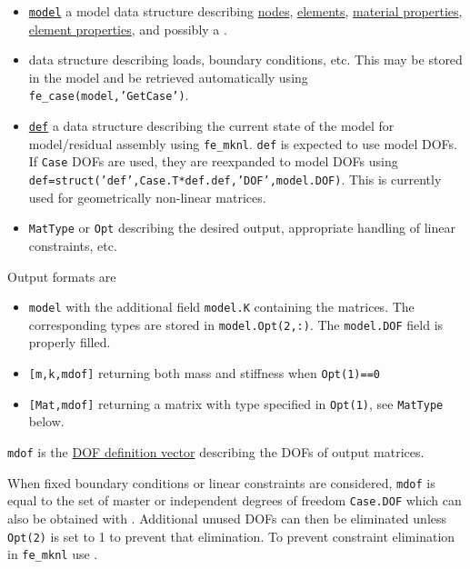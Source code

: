 \begin{itemize}

\item \hyperlink{model}{{\tt model}} a model data structure describing \hyperlink{node}{nodes}, \hyperlink{elt}{elements}, \hyperlink{pl}{material properties}, \hyperlink{il}{element properties}, and possibly a .

\item {} data structure describing loads, boundary conditions, etc. This may be stored in the model and be retrieved automatically using {\tt fe\_case(model,'GetCase')}. 

\item \hyperlink{def}{{\tt def}} a data structure describing the current state of the model for model/residual assembly using {\tt fe\_mknl}. {\tt def} is expected to use model DOFs. If {\tt Case} DOFs are used, they are reexpanded to model DOFs using {\tt def=struct('def',Case.T*def.def,'DOF',model.DOF)}. This is currently used for geometrically non-linear matrices.

\item {\tt MatType} or {\tt Opt} describing the desired output, appropriate handling of linear constraints, etc. 

\end{itemize}

Output formats are

\begin{itemize}

\item {\tt model} with the additional field {\tt model.K} containing the matrices. The corresponding types are stored in {\tt model.Opt(2,:)}. The {\tt model.DOF} field is properly filled.
\item {\tt [m,k,mdof]} returning both mass and stiffness when {\tt Opt(1)==0}
\item {\tt [Mat,mdof]} returning a matrix with type specified in {\tt Opt(1)}, see {\tt MatType} below.

\end{itemize}

{\tt mdof} is the \hyperlink{mdof}{DOF definition vector} describing the DOFs of output matrices. 

When fixed boundary conditions or linear constraints are considered, {\tt mdof} is equal to the set of master or independent degrees of freedom {\tt Case.DOF} which can also be obtained with . Additional unused DOFs can then be eliminated unless {\tt Opt(2)} is set to 1 to prevent that elimination. To prevent constraint elimination in {\tt fe\_mknl} use .

